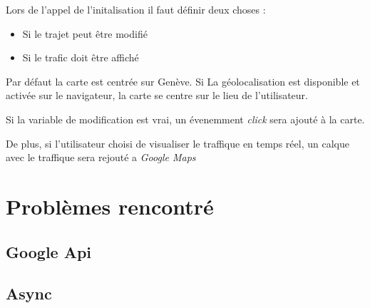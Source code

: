 \documentclass[a4paper]{article}
\newcommand{\rpi}{\emph{Raspbery Pi}}
\newcommand{\gmap}{\emph{Google Maps}}
\newcommand{\diag}[1]{}
\begin{document}
Lors de l'appel de l'initalisation il faut définir deux choses :
\begin{itemize}
	\item Si le trajet peut être modifié
	\item Si le trafic doit être affiché
\end{itemize}

Par défaut la carte est centrée sur Genève. Si La géolocalisation est disponible et activée sur le navigateur, la carte se centre sur le lieu de l'utilisateur.

Si la variable de modification est vrai, un évenemment \emph{click} sera ajouté à la carte.

De plus, si l'utilisateur choisi de visualiser le traffique en temps réel, un calque avec le traffique sera rejouté a \gmap


\begin{center}
	\diag{initMap}
\end{center}

\pagebreak

\section{Problèmes rencontré}
\subsection{Google Api}
\subsection{Async}

\end{document}
